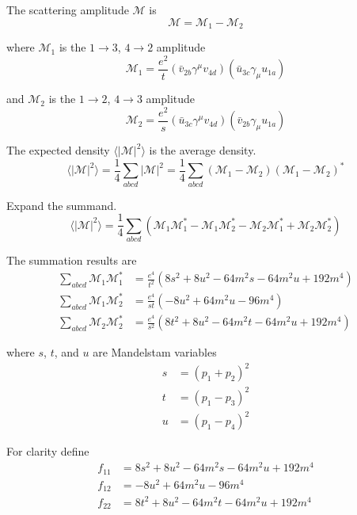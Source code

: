 The scattering amplitude $\mathcal M$ is
\begin{equation*}
\mathcal M=\mathcal M_1-\mathcal M_2
\end{equation*}

where $\mathcal M_1$ is the $1\rightarrow3$, $4\rightarrow2$ amplitude
\begin{equation*}
\mathcal M_1=\frac{e^2}{t}
(\bar v_{2b}\gamma^\mu v_{4d})(\bar u_{3c}\gamma_\mu u_{1a})
\end{equation*}

and $\mathcal M_2$ is the $1\rightarrow2$, $4\rightarrow3$ amplitude
\begin{equation*}
\mathcal M_2=\frac{e^2}{s}
(\bar u_{3c}\gamma^\mu v_{4d})(\bar v_{2b}\gamma_\mu u_{1a})
\end{equation*}

The expected density $\langle|\mathcal M|^2\rangle$ is the average density.
\begin{equation*}
\langle|\mathcal M|^2\rangle
=\frac{1}{4}\sum_{abcd}|\mathcal M|^2
=\frac{1}{4}\sum_{abcd}(\mathcal M_1-\mathcal M_2)(\mathcal M_1-\mathcal M_2)^*
\end{equation*}

Expand the summand.
\begin{equation*}
\langle|\mathcal{M}|^2\rangle=\frac{1}{4}
\sum_{abcd}
\left(
\mathcal M_1\mathcal M_1^*-
\mathcal M_1\mathcal M_2^*-
\mathcal M_2\mathcal M_1^*+
\mathcal M_2\mathcal M_2^*
\right)
\end{equation*}

The summation results are
\begin{align*}
\sum_{abcd}
\mathcal M_1\mathcal M_1^*&=\frac{e^4}{t^2}
\left(8 s^2 + 8 u^2 - 64 m^2 s - 64 m^2 u + 192 m^4\right)
\\
\sum_{abcd}
\mathcal M_1\mathcal M_2^*&=\frac{e^4}{st}
\left(-8 u^2 + 64 m^2 u - 96 m^4\right)
\\
\sum_{abcd}
\mathcal M_2\mathcal M_2^*&=\frac{e^4}{s^2}
\left(8 t^2 + 8 u^2 - 64 m^2 t - 64 m^2 u + 192 m^4\right)
\end{align*}

where $s$, $t$, and $u$ are Mandelstam variables
\begin{align*}
s&=(p_1+p_2)^2
\\
t&=(p_1-p_3)^2
\\
u&=(p_1-p_4)^2
\end{align*}

For clarity define
\begin{align*}
f_{11}&=8 s^2 + 8 u^2 - 64 m^2 s - 64 m^2 u + 192 m^4
\\
f_{12}&=-8 u^2 + 64 m^2 u - 96 m^4
\\
f_{22}&=8 t^2 + 8 u^2 - 64 m^2 t - 64 m^2 u + 192 m^4
\end{align*}

